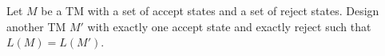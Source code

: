 Let $M$ be a TM with a set of accept states and a set of reject states.
Design another TM $M'$ with
exactly one accept state and exactly reject
such that
$L(M) = L(M')$.

